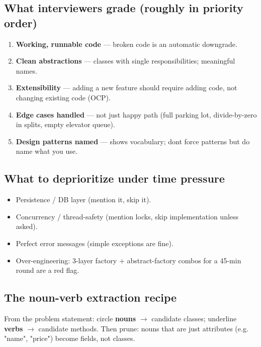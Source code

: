\documentclass[11pt]{article}
\providecommand{\tightlist}{\setlength{\itemsep}{1pt}\setlength{\parskip}{0pt}}
\begin{document}
\subsection{What interviewers grade (roughly in priority order)}\label{what-interviewers-grade-roughly-in-priority-order}

\begin{enumerate}
\def\labelenumi{\arabic{enumi}.}
\tightlist
\item
  \textbf{Working, runnable code} --- broken code is an automatic downgrade.
\item
  \textbf{Clean abstractions} --- classes with single responsibilities; meaningful names.
\item
  \textbf{Extensibility} --- adding a new feature should require adding code, not changing existing code (OCP).
\item
  \textbf{Edge cases handled} --- not just happy path (full parking lot, divide-by-zero in splits, empty elevator queue).
\item
  \textbf{Design patterns named} --- shows vocabulary; don\textquotesingle t force patterns but do name what you use.
\end{enumerate}

\subsection{What to deprioritize under time pressure}\label{what-to-deprioritize-under-time-pressure}

\begin{itemize}
\tightlist
\item
  Persistence / DB layer (mention it, skip it).
\item
  Concurrency / thread-safety (mention locks, skip implementation unless asked).
\item
  Perfect error messages (simple exceptions are fine).
\item
  Over-engineering: 3-layer factory + abstract-factory combos for a 45-min round are a red flag.
\end{itemize}

\subsection{The noun-verb extraction recipe}\label{the-noun-verb-extraction-recipe}

From the problem statement: circle \textbf{nouns} \(\rightarrow\) candidate classes; underline \textbf{verbs} \(\rightarrow\) candidate methods. Then prune: nouns that are just attributes (e.g. "name", "price") become fields, not classes.
\end{document}
